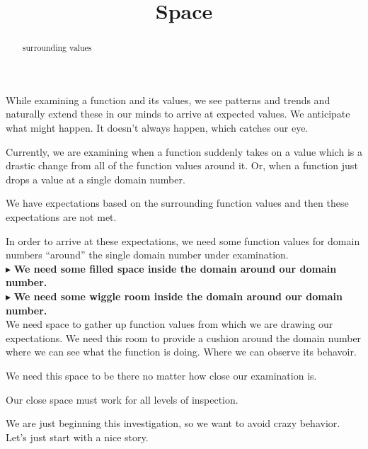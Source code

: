 \documentclass{ximera}
\title{Space}
\begin{document}
\begin{abstract}
surrounding values
\end{abstract}
\maketitle




While examining a function and its values, we see patterns and trends and naturally extend these in our minds to arrive at expected values. We anticipate what might happen.  It doesn't always happen, which catches our eye.

Currently, we are examining when a function suddenly takes on a value which is a drastic change from all of the function values around it.  Or, when a function just drops a value at a single domain number.

We have expectations based on the surrounding function values and then these expectations are not met.

In order to arrive at these expectations, we need some function values for domain numbers ``around'' the single domain number under examination. \\


$\blacktriangleright$ \textbf{\textcolor{purple!85!blue}{We need some filled space inside the domain around our domain number.}} \\

$\blacktriangleright$ \textbf{\textcolor{purple!85!blue}{We need some wiggle room inside the domain around our domain number.}} \\




We need space to gather up function values from which we are drawing our expectations.  We need this room to provide a cushion around the domain number where we can see what the function is doing. Where we can observe its behavoir. 


We need this space to be there no matter how close our examination is.  


Our close space must work for all levels of inspection.


We are just beginning this investigation, so we want to avoid crazy behavior.  Let's just start with a nice story.
\end{document}

